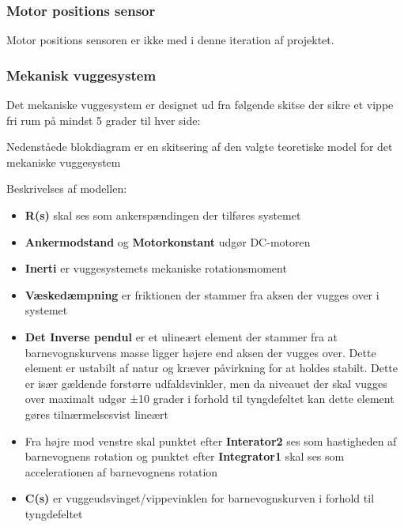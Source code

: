 
\subsubsection{Motor positions sensor}
Motor positions sensoren er ikke med i denne iteration af projektet.
\subsubsection{Mekanisk vuggesystem}\label{Vuggesystem: Design_MekVug} 
Det mekaniske vuggesystem er designet ud fra følgende skitse der sikre et vippe fri rum på mindst 5 grader til hver side: \\




Nedenståede blokdiagram er en skitsering af den valgte teoretiske model for det mekaniske vuggesystem


Beskrivelses af modellen:
\begin{itemize}
\item \textbf{R(s)} skal ses som ankerspændingen der tilføres systemet
\item \textbf{Ankermodstand} og \textbf{Motorkonstant} udgør DC-motoren
\item \textbf{Inerti} er vuggesystemets mekaniske rotationsmoment
\item \textbf{Væskedæmpning} er friktionen der stammer fra aksen der vugges over i systemet
\item \textbf{Det Inverse pendul} er et ulineært element der stammer fra at barnevognskurvens masse ligger højere end aksen der vugges over. Dette element er ustabilt af natur og kræver påvirkning for at holdes stabilt. Dette er især gældende forstørre udfaldsvinkler, men da niveauet der skal vugges over maximalt udgør ±10 grader i forhold til tyngdefeltet kan dette element gøres tilnærmelsesvist lineært
\item Fra højre mod venstre skal punktet efter \textbf{Interator2} ses som hastigheden af barnevognens rotation og punktet efter \textbf{Integrator1} skal ses som accelerationen af barnevognens rotation
\item \textbf{C(s)} er vuggeudsvinget/vippevinklen for barnevognskurven i forhold til tyngdefeltet

\end{itemize}

